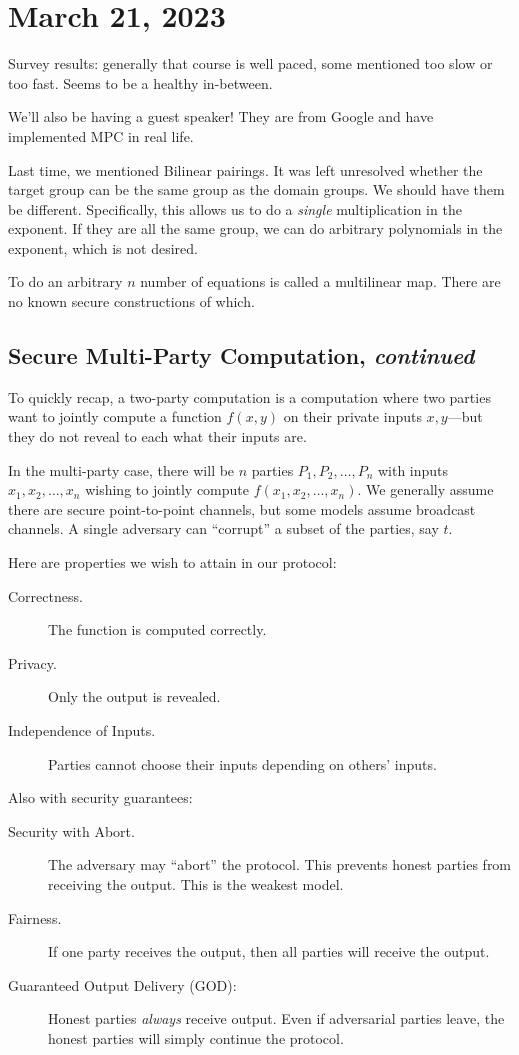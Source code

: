 \section{March 21, 2023}
\label{20230321}

Survey results: generally that course is well paced, some mentioned too slow or too fast. Seems to be a healthy in-between.

We'll also be having a guest speaker! They are from Google and have implemented MPC in real life.

Last time, we mentioned Bilinear pairings. It was left unresolved whether the target group can be the same group as the domain groups. We should have them be different. Specifically, this allows us to do a \emph{single} multiplication in the exponent. If they are all the same group, we can do arbitrary polynomials in the exponent, which is not desired.

To do an arbitrary $n$ number of equations is called a multilinear map. There are no known secure constructions of which.

\subsection{Secure Multi-Party Computation, \emph{continued}}
To quickly recap, a two-party computation is a computation where two parties want to jointly compute a function $f(x, y)$ on their private inputs $x, y$---but they do not reveal to each what their inputs are.

In the multi-party case, there will be $n$ parties $P_1, P_2, \dots, P_n$ with inputs $x_1, x_2, \dots, x_n$ wishing to jointly compute $f(x_1, x_2, \dots, x_n)$. We generally assume there are secure point-to-point channels, but some models assume broadcast channels. A single adversary can ``corrupt'' a subset of the parties, say $t$.

Here are properties we wish to attain in our protocol:
\begin{description}
    \item[Correctness.] The function is computed correctly.
    \item[Privacy.] Only the output is revealed.
    \item[Independence of Inputs.] Parties cannot choose their inputs depending on others' inputs.
\end{description}
Also with security guarantees:
\begin{description}
    \item[Security with Abort.] The adversary may ``abort'' the protocol. This prevents honest parties from receiving the output. This is the weakest model.
    \item[Fairness.] If one party receives the output, then all parties will receive the output.
    \item[Guaranteed Output Delivery (GOD):] Honest parties \emph{always} receive output. Even if adversarial parties leave, the honest parties will simply continue the protocol.
\end{description}

